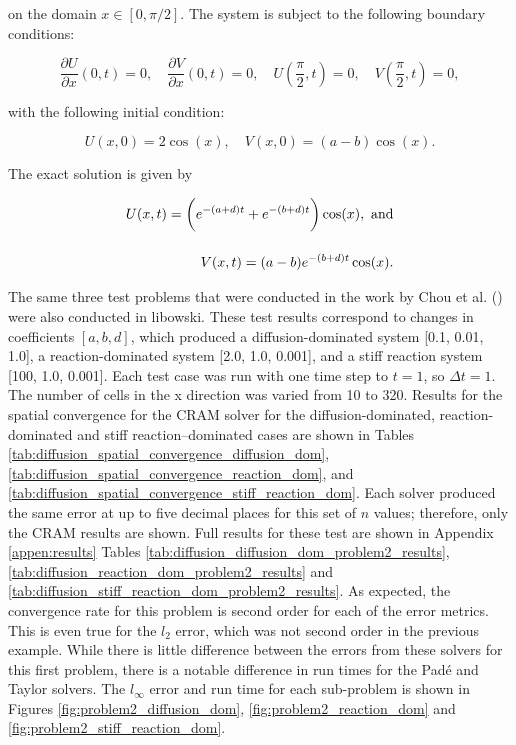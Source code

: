 \noindent on the domain $x \in [0, \pi/2]$. The system is subject to the following boundary conditions: 

\begin{equation}
    \frac{\partial U}{\partial x}(0,t) = 0, \quad \frac{\partial V}{\partial x}(0,t) = 0, \quad U(\frac{\pi}{2}, t) = 0, \quad V(\frac{\pi}{2}, t)= 0,
\end{equation}

\noindent with the following initial condition:

\begin{equation}
    U(x,0) = 2\cos(x), \quad V(x,0) = (a-b)\cos(x).
\end{equation}

\noindent The exact solution is given by

\begin{equation}
\setlength{\jot}{15pt}
\begin{split}
    U(x,t) = \bigg( e^{-(a+d)t} + e^{-(b+d)t}\bigg)\cos(x), \text{ and} \\
    V(x,t) = (a - b) e^{-(b+d)t}\cos(x).
\end{split}
\end{equation}

The same three test problems that were conducted in the work by Chou et al. (\cite{ching2007}) were also conducted in libowski. These test results correspond to changes in coefficients $[a, b, d]$, which produced a diffusion-dominated system [0.1, 0.01, 1.0], a reaction-dominated system [2.0, 1.0, 0.001], and a stiff reaction system [100, 1.0, 0.001]. Each test case was run with one time step to $t = 1$, so $\Delta t = 1$. The number of cells in the x direction was varied from 10 to 320. Results for the spatial convergence for the CRAM solver for the diffusion-dominated, reaction-dominated and stiff reaction--dominated cases are shown in Tables \ref{tab:diffusion_spatial_convergence_diffusion_dom}, \ref{tab:diffusion_spatial_convergence_reaction_dom}, and \ref{tab:diffusion_spatial_convergence_stiff_reaction_dom}. Each solver produced the same error at up to five decimal places for this set of $n$ values; therefore, only the CRAM results are shown. Full results for these test are shown in Appendix \ref{appen:results} Tables \ref{tab:diffusion_diffusion_dom_problem2_results}, \ref{tab:diffusion_reaction_dom_problem2_results} and \ref{tab:diffusion_stiff_reaction_dom_problem2_results}. As expected, the convergence rate for this problem is second order for each of the error metrics. This is even true for the $l_{2}$ error, which was not second order in the previous example. While there is little difference between the errors from these solvers for this first problem, there is a notable difference in run times for the Pad\'e and Taylor solvers. The $l_{\infty}$ error and run time for each sub-problem is shown in Figures \ref{fig:problem2_diffusion_dom}, \ref{fig:problem2_reaction_dom} and \ref{fig:problem2_stiff_reaction_dom}. 

